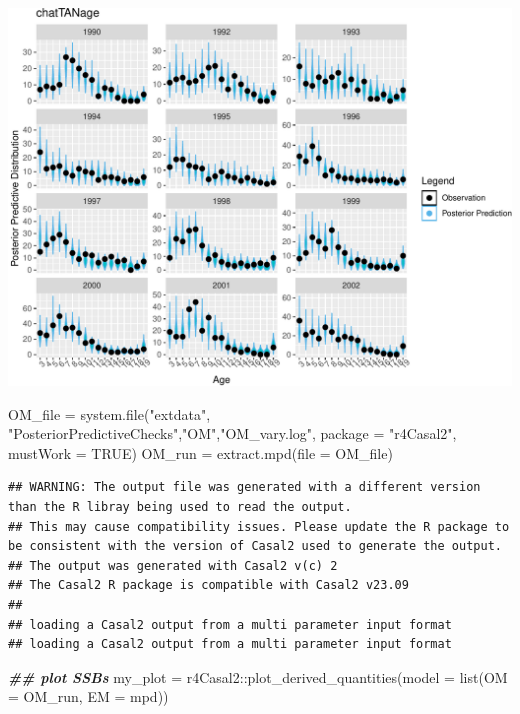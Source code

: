 \documentclass[
]{book}
\newenvironment{Shaded}{\begin{snugshade}}{\end{snugshade}}
\newcommand{\AttributeTok}[1]{\textcolor[rgb]{0.77,0.63,0.00}{#1}}
\newcommand{\ConstantTok}[1]{\textcolor[rgb]{0.00,0.00,0.00}{#1}}
\newcommand{\DocumentationTok}[1]{\textcolor[rgb]{0.56,0.35,0.01}{\textbf{\textit{#1}}}}
\newcommand{\FunctionTok}[1]{\textcolor[rgb]{0.00,0.00,0.00}{#1}}
\newcommand{\NormalTok}[1]{#1}
\newcommand{\OtherTok}[1]{\textcolor[rgb]{0.56,0.35,0.01}{#1}}
\newcommand{\SpecialCharTok}[1]{\textcolor[rgb]{0.00,0.00,0.00}{#1}}
\newcommand{\StringTok}[1]{\textcolor[rgb]{0.31,0.60,0.02}{#1}}
\begin{document}
\includegraphics{_main_files/figure-latex/ggplots_ppp-2.pdf}

\begin{Shaded}
\begin{Highlighting}[]
\NormalTok{OM\_file }\OtherTok{=} \FunctionTok{system.file}\NormalTok{(}\StringTok{"extdata"}\NormalTok{, }\StringTok{"PosteriorPredictiveChecks"}\NormalTok{,}\StringTok{"OM"}\NormalTok{,}\StringTok{"OM\_vary.log"}\NormalTok{, }\AttributeTok{package =} \StringTok{"r4Casal2"}\NormalTok{, }\AttributeTok{mustWork =} \ConstantTok{TRUE}\NormalTok{)}
\NormalTok{OM\_run }\OtherTok{=} \FunctionTok{extract.mpd}\NormalTok{(}\AttributeTok{file =}\NormalTok{ OM\_file)}
\end{Highlighting}
\end{Shaded}

\begin{verbatim}
## WARNING: The output file was generated with a different version than the R libray being used to read the output.
## This may cause compatibility issues. Please update the R package to be consistent with the version of Casal2 used to generate the output.
## The output was generated with Casal2 v(c) 2
## The Casal2 R package is compatible with Casal2 v23.09
## 
## loading a Casal2 output from a multi parameter input format
## loading a Casal2 output from a multi parameter input format
\end{verbatim}

\begin{Shaded}
\begin{Highlighting}[]
\DocumentationTok{\#\# plot SSBs}
\NormalTok{my\_plot }\OtherTok{=}\NormalTok{ r4Casal2}\SpecialCharTok{::}\FunctionTok{plot\_derived\_quantities}\NormalTok{(}\AttributeTok{model =} \FunctionTok{list}\NormalTok{(}\AttributeTok{OM =}\NormalTok{ OM\_run, }\AttributeTok{EM =}\NormalTok{ mpd))}
\end{Highlighting}
\end{Shaded}
\end{document}
